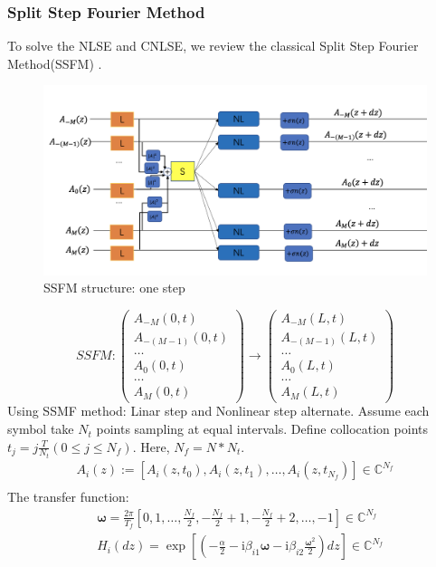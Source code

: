 \subsubsection{Split Step Fourier Method}
To solve the NLSE and CNLSE, we review the classical Split Step Fourier Method(SSFM) .
\begin{figure}[htbp]
\centering
\includegraphics[width=0.6\linewidth]{img/SSFM.png}
\caption{SSFM structure: one step}
\label{SSFM fig}
\end{figure}
$$
SSFM: \left(\begin{array}{c}A_{-M}(0,t)\\A_{-(M-1)}(0,t)\\\ldots\\A_{0}(0,t)\\\ldots\\A_{M}(0,t)\end{array}\right) \rightarrow\left(\begin{array}{c}A_{-M}(L,t)\\A_{-(M-1)}(L,t)\\\ldots\\A_{0}(L,t)\\\ldots\\A_{M}(L,t)\end{array}\right)
$$
Using SSMF method: Linar step and Nonlinear step alternate. Assume each symbol take $N_t$ points sampling at equal intervals. Define collocation points $t_j = j\frac{T}{N_t} (0\leq j \leq N_{f})$. Here, $N_{f} = N*N_t$. 
\begin{align*}
A_i(z) := [A_i(z,t_0), A_i(z,t_1),\ldots,A_i(z,t_{N_{f}})] \in \mathbb{C}^{N_{f}} \\
\end{align*}
The transfer function:
\begin{align*}
& \mathbf{\omega} = \frac{2\pi}{T_f}[0,1,\ldots,\frac{N_f}{2},-\frac{N_f}{2}+1,-\frac{N_f}{2}+2,\ldots,-1] \in \mathbb{C}^{N_f}\\
& H_i(dz) = \exp \left[\left(-\frac{\alpha}{2} - \mathrm{i}\beta_{i1} \mathbf{\omega} - \mathrm{i} \beta_{i2} \frac{\mathbf{\omega}^{2}}{2}\right) dz\right] \in \mathbb{C}^{N_f}
\end{align*}
